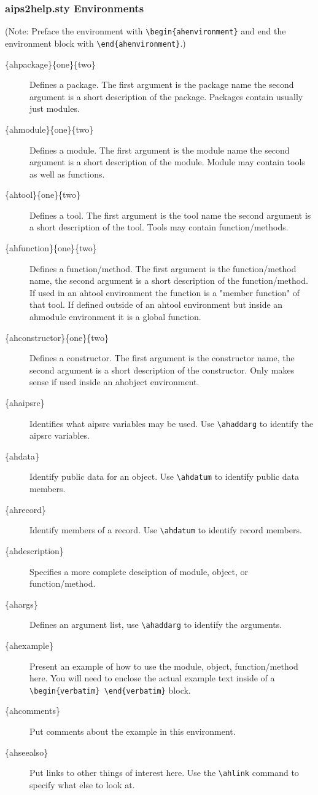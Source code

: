 \subsubsection{aips2help.sty Environments}
(Note: Preface the environment with
\verb!\begin{ahenvironment}!  and end the environment block with 
\verb!\end{ahenvironment}!.)
\begin{description}
\item[\{ahpackage\}\{one\}\{two\}] Defines a package. The first argument
is the package name the second argument is a short description of the package.
Packages contain usually just modules.
\item[\{ahmodule\}\{one\}\{two\}] Defines a module. The first argument
is the module name the second argument is a short description of the module.
Module may contain tools as well as functions.
\item[\{ahtool\}\{one\}\{two\}] Defines a tool. The first argument
is the tool name the second argument is a short description of the
tool.  Tools may contain function/methods.
\item[\{ahfunction\}\{one\}\{two\}] Defines a function/method. The first
argument is the function/method name, the second argument is a short
description of the function/method.  If used in an ahtool environment
the function is a "member function" of that tool.  If defined outside 
of an ahtool environment but inside an ahmodule environment it is a 
global function.
\item[\{ahconstructor\}\{one\}\{two\}] Defines a constructor.  The first
argument is the constructor name, the second argument is a short description
of the constructor.  Only makes sense if used inside an ahobject environment.
\item[\{ahaipsrc\}]Identifies what aipsrc variables may be used.  Use
\verb!\ahaddarg! to identify the aipsrc variables.
\item[\{ahdata\}]Identify public data for an object. Use \verb!\ahdatum! to
identify public data members.
\item[\{ahrecord\}]Identify members of a record.  Use \verb!\ahdatum! to
identify record members.
\item[\{ahdescription\}] Specifies a more complete desciption of module,
object, or function/method.
\item[\{ahargs\}] Defines an argument list, use \verb!\ahaddarg! to identify the
arguments.
\item[\{ahexample\}] Present an example of how to use the module, object,
function/method here.  You will need to enclose the actual example text
inside of a \verb!\begin{verbatim} \end{verbatim}! block.
\item[\{ahcomments\}] Put comments about the example in this environment.
\item[\{ahseealso\}] Put links to other things of interest here.  Use the
\verb!\ahlink! command to specify what else to look at.
\end{description}

